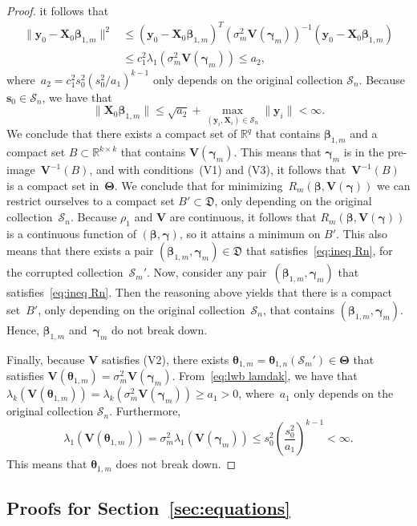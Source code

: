 \documentclass{article}
\numberwithin{equation}{section}
\theoremstyle{plain}
\newcommand{\R}{\mathbb{R}}
\newcommand{\bbeta}{\bm\beta}
\newcommand{\btheta}{\bm\theta}
\newcommand{\bgamma}{\bm\gamma}
\newcommand{\bTheta}{\bm\Theta}
\newcommand{\by}{\mathbf{y}}
\newcommand{\bs}{\mathbf{s}}
\newcommand{\bX}{\mathbf{X}}
\newcommand{\bV}{\mathbf{V}}
\begin{document}
\begin{proof}
it follows that
\[
\begin{split}
\|\by_0-\bX_0\bbeta_{1,m}\|^2
&\leq
(\by_0-\bX_0\bbeta_{1,m})^T
(\sigma_m^2\bV(\bgamma_m))^{-1}
(\by_0-\bX_0\bbeta_{1,m})\\
&\leq
c_1^2
\lambda_1(\sigma_m^2\bV(\bgamma_m))
\leq 
a_2,
\end{split}
\]
where~$a_2=c_1^2s_0^2(s_0^2/a_1)^{k-1}$ only depends on the original collection $\mathcal{S}_n$.
Because $\bs_0\in \mathcal{S}_n$, we have that
\[
\|\bX_0\bbeta_{1,m}\|
\leq
\sqrt{a_2}
+
\max_{(\by_i,\bX_i)\in \mathcal{S}_n}
\|\by_i\|
<\infty.
\]
We conclude that there exists a compact set of $\R^q$ that contains $\bbeta_{1,m}$
and a compact set $B\subset\R^{k\times k}$ that contains $\bV(\bgamma_m)$.
This means that $\bgamma_m$ is in the pre-image~$\bV^{-1}(B)$,
and with conditions~(V1) and (V3), it follows that~$\bV^{-1}(B)$ is a compact set in~$\bTheta$.
We conclude that for minimizing~$R_m(\bbeta,\bV(\bgamma))$ 
we can restrict ourselves to a compact set $B'\subset \mathfrak{D}$, only depending on the original collection~$\mathcal{S}_n$.
Because $\rho_1$ and $\bV$ are continuous, it follows that
$R_m(\bbeta,\bV(\bgamma))$ is a continuous function of $(\bbeta,\bgamma)$,
so it attains a minimum on $B'$.
This also means that there exists a pair $(\bbeta_{1,m},\bgamma_m)\in \mathfrak{D}$ 
that satisfies~\eqref{eq:ineq Rn}, for the corrupted collection~$\mathcal{S}_m'$.
Now, consider any pair~$(\bbeta_{1,m},\bgamma_m)$ that satisfies~\eqref{eq:ineq Rn}.
Then the reasoning above yields that there is a compact set~$B'$, 
only depending on the original collection~$\mathcal{S}_n$, that contains $(\bbeta_{1,m},\bgamma_m)$.
Hence, $\bbeta_{1,m}$ and~$\bgamma_m$ do not break down.

Finally, because $\bV$ satisfies (V2), there exists 
$\btheta_{1,m}=\btheta_{1,n}(\mathcal{S}_m')\in\bTheta$ that satisfies $\bV(\btheta_{1,m})=\sigma_m^2\bV(\bgamma_m)$.
From~\eqref{eq:lwb lamdak}, we have that 
$\lambda_k(\bV(\btheta_{1,m}))=\lambda_k(\sigma_m^2\bV(\bgamma_m))\geq a_1>0$,
where~$a_1$ only depends on the original collection $\mathcal{S}_n$.
Furthermore,
\[
\lambda_1(\bV(\btheta_{1,m}))
=
\sigma_m^2
\lambda_1(\bV(\bgamma_m))
\leq
s_0^2\left(\frac{s_0^2}{a_1}\right)^{k-1}
<\infty.
\]
This means that $\btheta_{1,m}$ does not break down.
\end{proof}

\subsection{Proofs for Section~\ref{sec:equations}}
\end{document}
